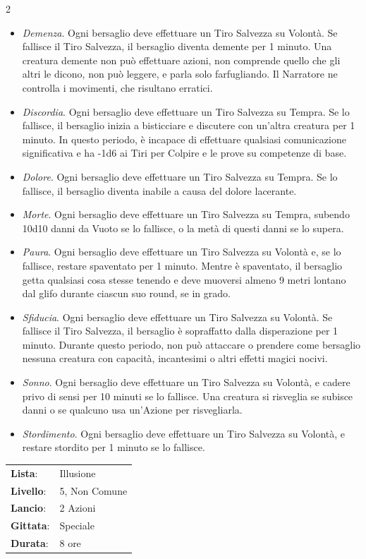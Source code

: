 \begin{multicols}{2}
\begin{itemize}[leftmargin=*] \setlength{\itemsep}{0pt}
	\item \emph{Demenza}. Ogni bersaglio deve effettuare un Tiro Salvezza su Volontà. Se fallisce il Tiro Salvezza, il bersaglio diventa demente per 1 minuto. Una creatura demente non può effettuare azioni, non comprende quello che gli altri le dicono, non può leggere, e parla solo farfugliando. Il Narratore ne controlla i movimenti, che risultano erratici.
	\item \emph{Discordia}. Ogni bersaglio deve effettuare un Tiro Salvezza su Tempra. Se lo fallisce, il bersaglio inizia a bisticciare e discutere con un'altra creatura per 1 minuto. In questo periodo, è incapace di effettuare qualsiasi comunicazione significativa e ha -1d6 ai Tiri per Colpire e le prove su competenze di base.
	\item \emph{Dolore}. Ogni bersaglio deve effettuare un Tiro Salvezza su Tempra. Se lo fallisce, il bersaglio diventa inabile a causa del dolore lacerante.
	\item \emph{Morte}. Ogni bersaglio deve effettuare un Tiro Salvezza su Tempra, subendo 10d10 danni da Vuoto se lo fallisce, o la metà di questi danni se lo supera.
	\item \emph{Paura}. Ogni bersaglio deve effettuare un Tiro Salvezza su Volontà e, se lo fallisce, restare spaventato per 1 minuto. Mentre è spaventato, il bersaglio getta qualsiasi cosa stesse tenendo e deve muoversi almeno 9 metri lontano dal glifo durante ciascun suo round, se in grado.
	\item \emph{Sfiducia}. Ogni bersaglio deve effettuare un Tiro Salvezza su Volontà. Se fallisce il Tiro Salvezza, il bersaglio è sopraffatto dalla disperazione per 1 minuto. Durante questo periodo, non può attaccare o prendere come bersaglio nessuna creatura con capacità, incantesimi o altri effetti magici nocivi.
	\item \emph{Sonno}. Ogni bersaglio deve effettuare un Tiro Salvezza su Volontà, e cadere privo di sensi per 10 minuti se lo fallisce. Una creatura si risveglia se subisce danni o se qualcuno usa un'Azione per risvegliarla.
	\item \emph{Stordimento}. Ogni bersaglio deve effettuare un Tiro Salvezza su Volontà, e restare stordito per 1 minuto se lo fallisce.
\end{itemize}

\noindent\begin{tabularx}{\linewidth}{p{1.9cm}X}
	\rowcolor{gray!20}\textbf{Lista}: & Illusione \\
	\textbf{Livello}: & 5, Non Comune \\
	\rowcolor{gray!20}\textbf{Lancio}: & 2 Azioni \\
	\textbf{Gittata}: & Speciale \\
	\rowcolor{gray!20}\textbf{Durata}: & 8 ore \\
\end{tabularx}\smallskip


\end{multicols}
